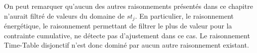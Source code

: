 On peut remarquer qu'aucun des autres raisonnements présentés dans ce
chapitre n'aurait filtré de valeurs du domaine de $st_j$. En
particulier, le raisonnement énergétique, le raisonnement permettant
de filtrer le plus de valeur pour la contrainte cumulative, ne détecte
pas d'ajustement dans ce cas. Le raisonnement Time-Table disjonctif
n'est donc dominé par aucun autre raisonnement existant. 




